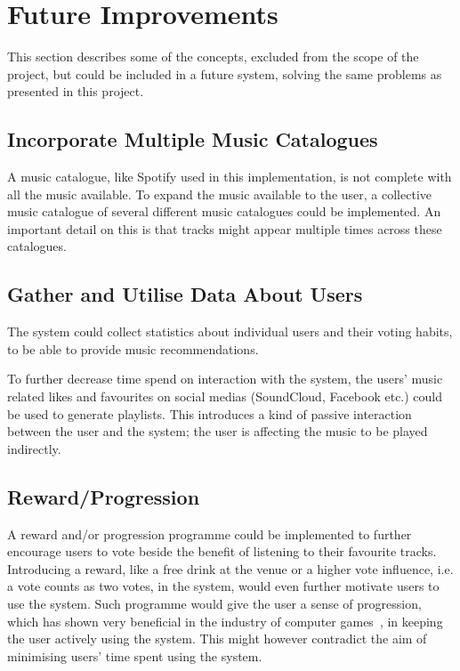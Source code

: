 \chapter{Future Improvements}
\label{future}

This section describes some of the concepts, excluded from the scope of the project, but could be included in a future system, solving the same problems as presented in this project. 

\section{Incorporate Multiple Music Catalogues}
A music catalogue, like Spotify used in this implementation, is not complete with all the music available. To expand the music available to the user, a collective music catalogue of several different music catalogues could be implemented. An important detail on this is that tracks might appear multiple times across these catalogues.

\section{Gather and Utilise Data About Users}
The system could collect statistics about individual users and their voting habits, to be able to provide music recommendations.

To further decrease time spend on interaction with the system, the users' music related likes and favourites on social medias (SoundCloud, Facebook etc.) could be used to generate playlists. This introduces a kind of passive interaction between the user and the system; the user is affecting the music to be played indirectly.

\section{Reward/Progression}
A reward and/or progression programme could be implemented to further encourage users to vote beside the benefit of listening to their favourite tracks. Introducing a reward, like a free drink at the venue or a higher vote influence, i.e. a vote counts as two votes, in the system, would even further motivate users to use the system. Such programme would give the user a sense of progression, which has shown very beneficial in the industry of computer games~\cite{games}, in keeping the user actively using the system. This might however contradict the aim of minimising users' time spent using the system.

